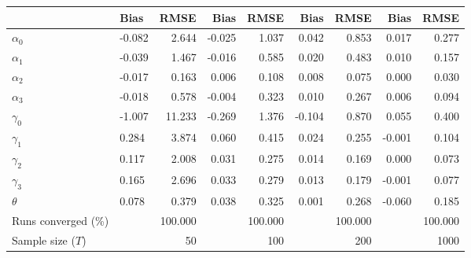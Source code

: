 
\begin{tabular}[t]{llrrrrrrr}
\toprule
  & Bias & RMSE & Bias & RMSE & Bias & RMSE & Bias & RMSE\\
\midrule
$\alpha_{0}$ & -0.082 & 2.644 & -0.025 & 1.037 & 0.042 & 0.853 & 0.017 & 0.277\\
$\alpha_{1}$ & -0.039 & 1.467 & -0.016 & 0.585 & 0.020 & 0.483 & 0.010 & 0.157\\
$\alpha_{2}$ & -0.017 & 0.163 & 0.006 & 0.108 & 0.008 & 0.075 & 0.000 & 0.030\\
$\alpha_{3}$ & -0.018 & 0.578 & -0.004 & 0.323 & 0.010 & 0.267 & 0.006 & 0.094\\
$\gamma_{0}$ & -1.007 & 11.233 & -0.269 & 1.376 & -0.104 & 0.870 & 0.055 & 0.400\\
$\gamma_{1}$ & 0.284 & 3.874 & 0.060 & 0.415 & 0.024 & 0.255 & -0.001 & 0.104\\
$\gamma_{2}$ & 0.117 & 2.008 & 0.031 & 0.275 & 0.014 & 0.169 & 0.000 & 0.073\\
$\gamma_{3}$ & 0.165 & 2.696 & 0.033 & 0.279 & 0.013 & 0.179 & -0.001 & 0.077\\
$\theta$ & 0.078 & 0.379 & 0.038 & 0.325 & 0.001 & 0.268 & -0.060 & 0.185\\
Runs converged (\%) &  & 100.000 &  & 100.000 &  & 100.000 &  & 100.000\\
Sample size ($T$) &  & 50 &  & 100 &  & 200 &  & 1000\\
\bottomrule
\end{tabular}
